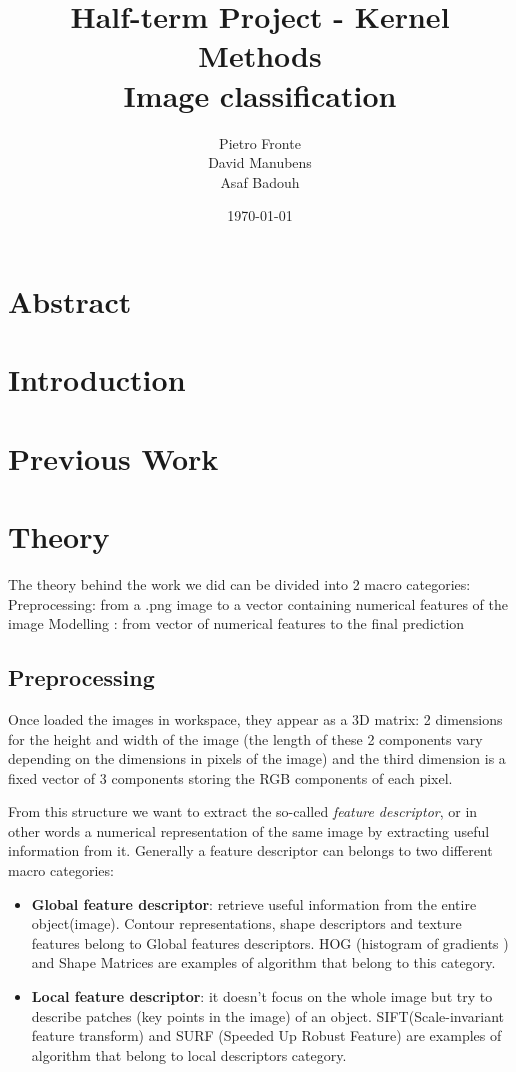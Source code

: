 \documentclass{article}
\title{Half-term Project - Kernel Methods\\Image classification}
\author{Pietro Fronte \\ David Manubens\\Asaf Badouh }
\date{\today}
\begin{document}
\maketitle
\section{Abstract}


\section{Introduction}


\section{Previous Work}


\section{Theory}\label{section:theory}

 
The theory behind the work we did can be divided into 2 macro categories: 
Preprocessing: from a .png image to a vector containing numerical features of the image
Modelling : from vector of numerical features to the final prediction

\subsection{Preprocessing}    

Once loaded the images in workspace, they appear as a 3D matrix: 2 dimensions for the height and width of the image (the length of these 2 components vary depending on the dimensions in pixels of the image) and the third dimension is a fixed vector of 3 components storing the RGB components of each pixel. \newline

From this structure we want to extract the so-called \textit{feature descriptor}, or in other words a numerical representation of the same image by extracting useful information from it. Generally a feature descriptor can belongs to two different macro categories:
\begin{itemize}
    \item \textbf{Global feature descriptor}: retrieve useful information from the entire object(image). Contour representations, shape descriptors and texture features belong to Global features descriptors. HOG (histogram of gradients ) and Shape Matrices are examples of algorithm that belong to this category.
    \item \textbf{Local feature descriptor}: it doesn't focus on the whole image but try to describe patches (key points in the image) of an object. SIFT(Scale-invariant feature transform) and SURF (Speeded Up Robust Feature) are examples of algorithm that belong to local descriptors category.
\end{itemize}
\end{document}
